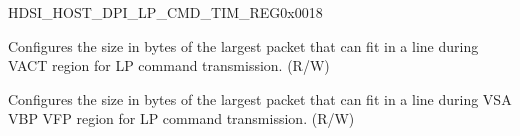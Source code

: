 \begin{register}{H}{DSI\_HOST\_DPI\_LP\_CMD\_TIM\_REG}{0x0018}\label{regdesc:DSIHOSTDPILPCMDTIMREG}
%
%
%
%
\regnewline%
\begin{regdesc}\begin{reglist}
\label{fielddesc:DSIHOSTINVACTLPCMDTIME}\item [DSI\_HOST\_INVACT\_LPCMD\_TIME] Configures the size in bytes of the largest packet that can fit in a line during VACT region for LP command transmission. (R/W)
\label{fielddesc:DSIHOSTOUTVACTLPCMDTIME}\item [DSI\_HOST\_OUTVACT\_LPCMD\_TIME] Configures the size in bytes of the largest packet that can fit in a line during VSA VBP VFP region for LP command transmission. (R/W)
\end{reglist}\end{regdesc}
\end{register}










